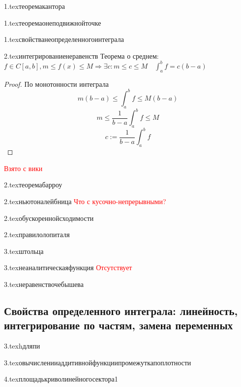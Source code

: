 {1.tex}{теоремакантора}

{1.tex}{теоремаонеподвижнойточке}

{1.tex}{свойстванеопределенногоинтеграла}
\label{integralproperties}

{2.tex}{интегрированиенеравенств}
Теорема о среднем: $f\in C[a,b], m\le f(x) \le M \Rightarrow \exists c : m\le c \le M \quad \int_a^b f = c(b-a)$
\begin{proof}
    По монотонности интеграла
    $$m(b-a)\le \int_a^b f \le M(b-a)$$
    $$m\le \frac{1}{b-a}\int_a^b f \le M$$
    $$c := \frac{1}{b-a}\int_a^b f$$
\end{proof}
\textcolor{red}{Взято с вики}

{2.tex}{теоремабарроу}

{2.tex}{ньютоналейбница}
\textcolor{red}{Что с кусочно-непрерывными?}

{2.tex}{обускореннойсходимости}

{2.tex}{правилолопиталя}

{3.tex}{штольца}

{3.tex}{неаналитическаяфункция}
\textcolor{red}{Отсутствует}

{3.tex}{неравенствочебышева}

\subsection{Свойства определенного интеграла: линейность, интегрирование по частям, замена переменных}

{3.tex}{hдляпи}

{3.tex}{овычисленииаддитивнойфункциипромежуткапоплотности}

{4.tex}{площадькриволинейногосектора1}

